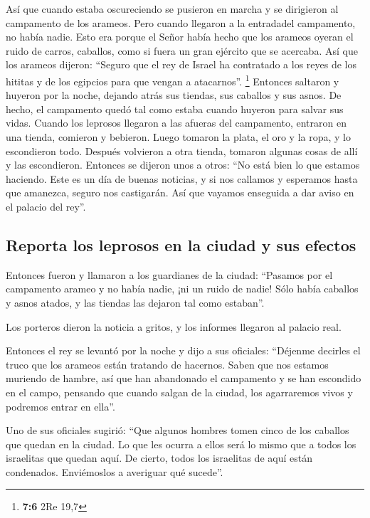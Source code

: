  Así que cuando estaba oscureciendo se pusieron en marcha
y se dirigieron al campamento de los arameos. Pero cuando llegaron a la
entradadel campamento, no había nadie.  Esto era porque el
Señor había hecho que los arameos oyeran el ruido de carros, caballos,
como si fuera un gran ejército que se acercaba. Así que los arameos
dijeron: ``Seguro que el rey de Israel ha contratado a los reyes de los
hititas y de los egipcios para que vengan a atacarnos''. \footnote{\textbf{7:6}
  2Re 19,7}  Entonces saltaron y huyeron por la noche,
dejando atrás sus tiendas, sus caballos y sus asnos. De hecho, el
campamento quedó tal como estaba cuando huyeron para salvar sus vidas.
 Cuando los leprosos llegaron a las afueras del
campamento, entraron en una tienda, comieron y bebieron. Luego tomaron
la plata, el oro y la ropa, y lo escondieron todo. Después volvieron a
otra tienda, tomaron algunas cosas de allí y las escondieron.
 Entonces se dijeron unos a otros: ``No está bien lo que
estamos haciendo. Este es un día de buenas noticias, y si nos callamos y
esperamos hasta que amanezca, seguro nos castigarán. Así que vayamos
enseguida a dar aviso en el palacio del rey''.

\hypertarget{reporta-los-leprosos-en-la-ciudad-y-sus-efectos}{%
\subsection{Reporta los leprosos en la ciudad y sus
efectos}\label{reporta-los-leprosos-en-la-ciudad-y-sus-efectos}}

 Entonces fueron y llamaron a los guardianes de la
ciudad: ``Pasamos por el campamento arameo y no había nadie, ¡ni un
ruido de nadie! Sólo había caballos y asnos atados, y las tiendas las
dejaron tal como estaban''.

 Los porteros dieron la noticia a gritos, y los informes
llegaron al palacio real.

 Entonces el rey se levantó por la noche y dijo a sus
oficiales: ``Déjenme decirles el truco que los arameos están tratando de
hacernos. Saben que nos estamos muriendo de hambre, así que han
abandonado el campamento y se han escondido en el campo, pensando que
cuando salgan de la ciudad, los agarraremos vivos y podremos entrar en
ella''.

 Uno de sus oficiales sugirió: ``Que algunos hombres
tomen cinco de los caballos que quedan en la ciudad. Lo que les ocurra a
ellos será lo mismo que a todos los israelitas que quedan aquí. De
cierto, todos los israelitas de aquí están condenados. Enviémoslos a
averiguar qué sucede''.

